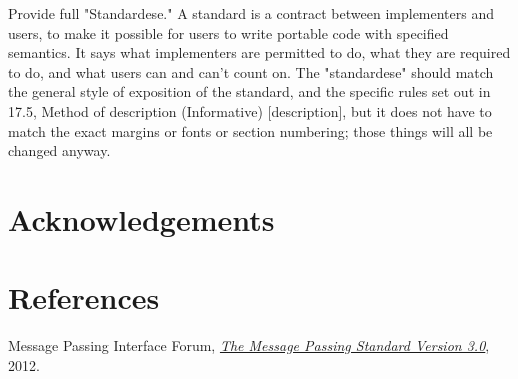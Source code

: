 \documentclass{isocpp_proposal}
\begin{document}
Provide full "Standardese." A standard is a contract between implementers and users, to make it possible for users to write portable code with specified semantics. It says what implementers are permitted to do, what they are required to do, and what users can and can't count on. The "standardese" should match the general style of exposition of the standard, and the specific rules set out in 17.5, Method of description (Informative) [description], but it does not have to match the exact margins or fonts or section numbering; those things will all be changed anyway.
\section{Acknowledgements}

\section{References}
\begin{thebibliography}{1} %
 Message Passing Interface Forum, {\em \href{www.mpi-forum.org/docs/mpi-3.0/mpi30-report.pdf}{The Message Passing Standard Version 3.0}},  2012.
\end{thebibliography}
\end{document}
